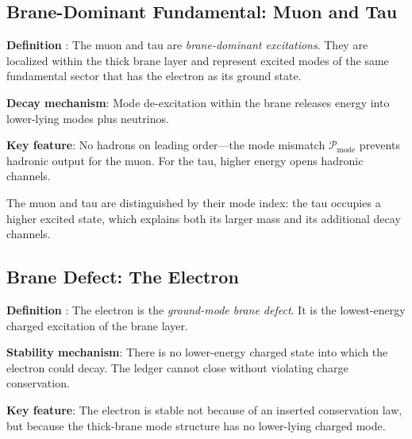 \subsection{Brane-Dominant Fundamental: Muon and Tau}

\begin{tcolorbox}[mechanism, title={Muon/Tau Ontology}]
\textbf{Definition} \tagP{}: The muon and tau are \emph{brane-dominant excitations}.
They are localized within the thick brane layer and represent excited modes of the
same fundamental sector that has the electron as its ground state.

\textbf{Decay mechanism}: Mode de-excitation within the brane releases energy into
lower-lying modes plus neutrinos.

\textbf{Key feature}: No hadrons on leading order---the mode mismatch
$\mathcal{P}_{\text{mode}}$ prevents hadronic output for the muon. For the tau,
higher energy opens hadronic channels.
\end{tcolorbox}

The muon and tau are distinguished by their mode index: the tau occupies a higher
excited state, which explains both its larger mass and its additional decay channels.

\subsection{Brane Defect: The Electron}

\begin{tcolorbox}[mechanism, title={Electron Ontology}]
\textbf{Definition} \tagP{}: The electron is the \emph{ground-mode brane defect}.
It is the lowest-energy charged excitation of the brane layer.

\textbf{Stability mechanism}: There is no lower-energy charged state into which
the electron could decay. The ledger cannot close without violating charge
conservation.

\textbf{Key feature}: The electron is stable not because of an inserted conservation
law, but because the thick-brane mode structure has no lower-lying charged mode.
\end{tcolorbox}


